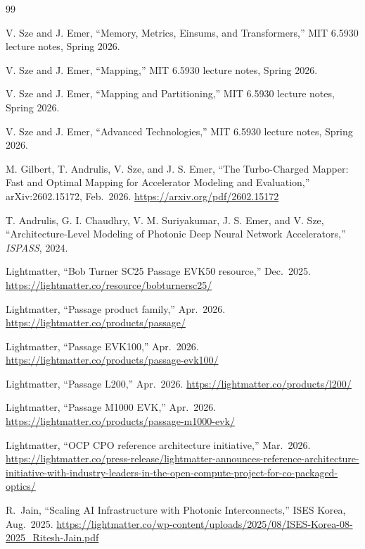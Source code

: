 \documentclass[conference]{IEEEtran}
\begin{document}
\begin{thebibliography}{99}
\footnotesize

 V. Sze and J. Emer, ``Memory, Metrics, Einsums,
and Transformers,'' MIT 6.5930 lecture notes, Spring 2026.

 V. Sze and J. Emer, ``Mapping,''
MIT 6.5930 lecture notes, Spring 2026.

 V. Sze and J. Emer, ``Mapping and
Partitioning,'' MIT 6.5930 lecture notes, Spring 2026.

 V. Sze and J. Emer, ``Advanced Technologies,''
MIT 6.5930 lecture notes, Spring 2026.

 M. Gilbert, T. Andrulis, V. Sze, and J. S. Emer,
``The Turbo-Charged Mapper: Fast and Optimal Mapping for Accelerator
Modeling and Evaluation,'' arXiv:2602.15172, Feb.\ 2026.
\url{https://arxiv.org/pdf/2602.15172}

 T. Andrulis, G. I. Chaudhry, V. M.
Suriyakumar, J. S. Emer, and V. Sze,
``Architecture-Level Modeling of Photonic Deep Neural Network
Accelerators,'' \emph{ISPASS}, 2024.

 Lightmatter, ``Bob Turner SC25 Passage
EVK50 resource,'' Dec.\ 2025.
\url{https://lightmatter.co/resource/bobturnersc25/}

 Lightmatter, ``Passage product family,''
Apr.\ 2026. \url{https://lightmatter.co/products/passage/}

 Lightmatter, ``Passage EVK100,'' Apr.\
2026. \url{https://lightmatter.co/products/passage-evk100/}

 Lightmatter, ``Passage L200,'' Apr.\ 2026.
\url{https://lightmatter.co/products/l200/}

 Lightmatter, ``Passage M1000 EVK,''
Apr.\ 2026.
\url{https://lightmatter.co/products/passage-m1000-evk/}

 Lightmatter, ``OCP CPO reference
architecture initiative,'' Mar.\ 2026.
\url{https://lightmatter.co/press-release/lightmatter-announces-reference-architecture-initiative-with-industry-leaders-in-the-open-compute-project-for-co-packaged-optics/}

 R.\ Jain, ``Scaling AI Infrastructure with
Photonic Interconnects,'' ISES Korea, Aug.\ 2025.
\url{https://lightmatter.co/wp-content/uploads/2025/08/ISES-Korea-08-2025_Ritesh-Jain.pdf}


\end{thebibliography}
\end{document}
